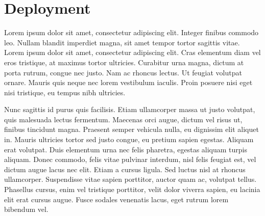 \documentclass[
  digital,     %
  oneside,     %
  nosansbold,  %
  nocolorbold, %
  lof,         %
  lot,         %
]{fithesis4}
\begin{document}
\section{Deployment}
Lorem ipsum dolor sit amet, consectetur adipiscing elit. Integer finibus commodo leo. Nullam blandit imperdiet magna, sit amet tempor tortor sagittis vitae. Lorem ipsum dolor sit amet, consectetur adipiscing elit. Cras elementum diam vel eros tristique, at maximus tortor ultricies. Curabitur urna magna, dictum at porta rutrum, congue nec justo. Nam ac rhoncus lectus. Ut feugiat volutpat ornare. Mauris quis neque nec lorem vestibulum iaculis. Proin posuere nisi eget nisi tristique, eu tempus nibh ultricies.

Nunc sagittis id purus quis facilisis. Etiam ullamcorper massa ut justo volutpat, quis malesuada lectus fermentum. Maecenas orci augue, dictum vel risus ut, finibus tincidunt magna. Praesent semper vehicula nulla, eu dignissim elit aliquet in. Mauris ultricies tortor sed justo congue, eu pretium sapien egestas. Aliquam erat volutpat. Duis elementum urna nec felis pharetra, egestas aliquam turpis aliquam. Donec commodo, felis vitae pulvinar interdum, nisl felis feugiat est, vel dictum augue lacus nec elit. Etiam a cursus ligula. Sed luctus nisl at rhoncus ullamcorper. Suspendisse vitae sapien porttitor, auctor quam ac, volutpat tellus. Phasellus cursus, enim vel tristique porttitor, velit dolor viverra sapien, eu lacinia elit erat cursus augue. Fusce sodales venenatis lacus, eget rutrum lorem bibendum vel.
\end{document}
